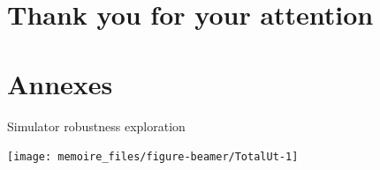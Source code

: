 \documentclass[11pt,ignorenonframetext,]{beamer}
\begin{document}
\hypertarget{thank-you-for-your-attention}{%
\section{Thank you for your
attention}\label{thank-you-for-your-attention}}

\hypertarget{annexes}{%
\section{Annexes}\label{annexes}}

\begin{frame}{Simulator robustness exploration}
\protect\hypertarget{simulator-robustness-exploration}{}

\begin{center}\texttt{[image: memoire\_files/figure-beamer/TotalUt-1]} \end{center}

\end{frame}
\end{document}
